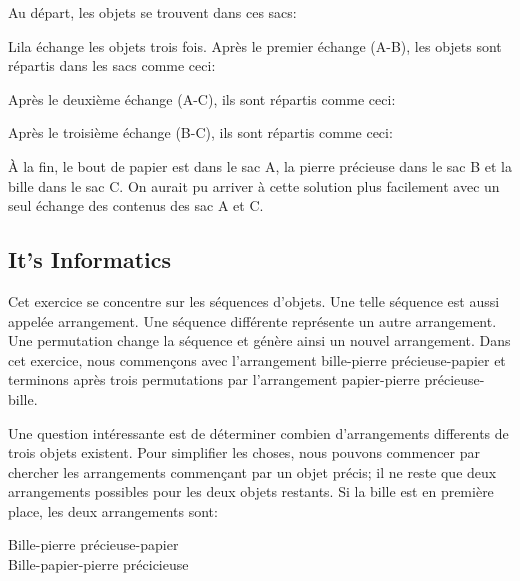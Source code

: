 \documentclass[a4paper,11pt]{report}
\makeatletter
\renewenvironment{adjustwidth}[2]{%
    \begin{list}{}{%
    \partopsep\z@%
    \topsep\z@%
    \listparindent\parindent%
    \parsep\parskip%
    \@ifmtarg{#1}{\setlength{\leftmargin}{\z@}}%
                 {\setlength{\leftmargin}{#1}}%
    \@ifmtarg{#2}{\setlength{\rightmargin}{\z@}}%
                 {\setlength{\rightmargin}{#2}}%
    }
    \item[]}{\end{list}}
\newcommand{\taskGraphicsFolder}{..}
\makeatother
\begin{document}
Au départ, les objets se trouvent dans ces sacs:

{\centering%
\par}

Lila échange les objets trois fois. Après le premier échange (A-B), les objets sont répartis dans les sacs comme ceci:

{\centering%
\par}

Après le deuxième échange (A-C), ils sont répartis comme ceci:

{\centering%
\par}

Après le troisième échange (B-C), ils sont répartis comme ceci:

{\centering%
\par}

À la fin, le bout de papier est dans le sac A, la pierre précieuse dans le sac B et la bille dans le sac C. On aurait pu arriver à cette solution plus facilement avec un seul échange des contenus des sac A et C.


\subsection*{It’s Informatics}

Cet exercice se concentre sur les séquences d’objets. Une telle séquence est aussi appelée arrangement. Une séquence différente représente un autre arrangement. Une permutation change la séquence et génère ainsi un nouvel arrangement. Dans cet exercice, nous commençons avec l’arrangement bille-pierre précieuse-papier et terminons après trois permutations par l’arrangement papier-pierre précieuse-bille.

Une question intéressante est de déterminer combien d’arrangements differents de trois objets existent. Pour simplifier les choses, nous pouvons commencer par chercher les arrangements commençant par un objet précis; il ne reste que deux arrangements possibles pour les deux objets restants. Si la bille est en première place, les deux arrangements sont:

\begin{adjustwidth}{1.5em}{0em}
Bille-pierre précieuse-papier     \\
Bille-papier-pierre précicieuse
\end{adjustwidth}
\end{document}
